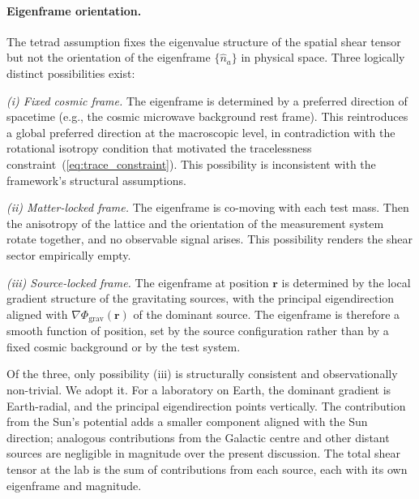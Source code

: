 \documentclass[pdflatex,sn-mathphys-num]{sn-jnl}%
\theoremstyle{thmstyleone}%
\theoremstyle{thmstyletwo}%
\theoremstyle{thmstylethree}%
\begin{document}
\paragraph{Eigenframe orientation.}
\label{para:eigenframe}
The tetrad assumption fixes the eigenvalue structure of the
spatial shear tensor but not the orientation of the eigenframe
$\{\hat{n}_a\}$ in physical space. Three logically distinct
possibilities exist:

\textit{(i) Fixed cosmic frame.}
The eigenframe is determined by a preferred direction
of spacetime (e.g., the cosmic microwave background rest
frame). This reintroduces a global preferred direction at the
macroscopic level, in contradiction with the rotational
isotropy condition that motivated the tracelessness
constraint~(\ref{eq:trace_constraint}). This possibility is
inconsistent with the framework's structural assumptions.

\textit{(ii) Matter-locked frame.}
The eigenframe is co-moving with each test mass. Then the
anisotropy of the lattice and the orientation of the
measurement system rotate together, and no observable signal
arises. This possibility renders the shear sector empirically
empty.

\textit{(iii) Source-locked frame.}
The eigenframe at position $\mathbf{r}$ is determined by the
local gradient structure of the gravitating sources, with the
principal eigendirection aligned with
$\nabla\Phi_{\mathrm{grav}}(\mathbf{r})$ of the dominant
source. The eigenframe is therefore a smooth function of
position, set by the source configuration rather than by a
fixed cosmic background or by the test system.

Of the three, only possibility (iii) is structurally
consistent and observationally non-trivial. We adopt it. For
a laboratory on Earth, the dominant gradient is Earth-radial,
and the principal eigendirection points vertically. The
contribution from the Sun's potential adds a smaller component
aligned with the Sun direction; analogous contributions from
the Galactic centre and other distant sources are negligible
in magnitude over the present discussion. The total shear
tensor at the lab is the sum of contributions from each
source, each with its own eigenframe and magnitude.
\end{document}
